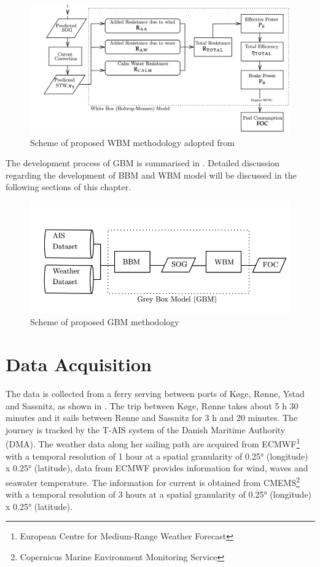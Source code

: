 \begin{figure}[h]
    \centering
        \includegraphics[width=\textwidth]{02_figures/flowmethod_WBM.png}
        \caption{Scheme of proposed WBM methodology adopted from }
        \label{fig:flowchart_WBM}
\end{figure}

The development process of GBM is summarised in . Detailed discussion regarding the development of BBM and WBM model will be discussed in the following sections of this chapter.

\begin{figure}[h]
    \centering
        \includegraphics[width=.85\textwidth]{02_figures/flowmethod_GBM_alt.png}
        \caption{Scheme of proposed GBM methodology}
        \label{fig:flowchart_GBM}
\end{figure}

\pagebreak

\section{Data Acquisition}\label{sec:data_acquisition}

The data is collected from a ferry serving between ports of K{\o}ge, R{\o}nne, Ystad and Sassnitz, as shown in  . The trip between K{\o}ge, R{\o}nne takes about 5 h 30 minutes and it sails between R{\o}nne and Sassnitz for 3 h and 20 minutes. The journey is tracked by the T-AIS system of the Danish Maritime Authority (DMA). The weather data along her sailing path are acquired from ECMWF\footnote{European Centre for Medium-Range Weather Forecast} with a temporal resolution of 1 hour at a spatial granularity of 0.25° (longitude) x 0.25° (latitude), data from ECMWF provides information for wind, waves and seawater temperature. The information for current is obtained from CMEMS\footnote{Copernicus Marine Environment Monitoring Service} with a temporal resolution of 3 hours at a spatial granularity of  0.25° (longitude) x 0.25° (latitude).\\ 

